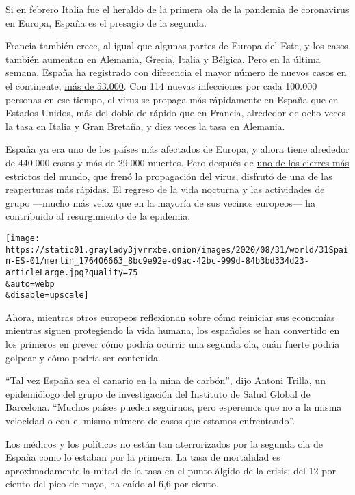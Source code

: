 Si en febrero Italia fue el heraldo de la primera ola de la pandemia de
coronavirus en Europa, España es el presagio de la segunda.

Francia también crece, al igual que algunas partes de Europa del Este, y
los casos también aumentan en Alemania, Grecia, Italia y Bélgica. Pero
en la última semana, España ha registrado con diferencia el mayor número
de nuevos casos en el continente,
\href{https://www.nytimes3xbfgragh.onion/interactive/2020/world/europe/spain-coronavirus-cases.html}{más
de 53.000}. Con 114 nuevas infecciones por cada 100.000 personas en ese
tiempo, el virus se propaga más rápidamente en España que en Estados
Unidos, más del doble de rápido que en Francia, alrededor de ocho veces
la tasa en Italia y Gran Bretaña, y diez veces la tasa en Alemania.

España ya era uno de los países más afectados de Europa, y ahora tiene
alrededor de 440.000 casos y más de 29.000 muertes. Pero después de
\href{https://www.nytimes3xbfgragh.onion/2020/04/07/world/europe/spain-coronavirus.html?searchResultPosition=119}{uno
de los cierres más estrictos del mundo}, que frenó la propagación del
virus, disfrutó de una de las reaperturas más rápidas. El regreso de la
vida nocturna y las actividades de grupo ---mucho más veloz que en la
mayoría de sus vecinos europeos--- ha contribuido al resurgimiento de la
epidemia.

\texttt{[image: https://static01.graylady3jvrrxbe.onion/images/2020/08/31/world/31Spain-ES-01/merlin\_176406663\_8bc9e92e-d9ac-42bc-999d-84b3bd334d23-articleLarge.jpg?quality=75\\\&auto=webp\\\&disable=upscale]}

Ahora, mientras otros europeos reflexionan sobre cómo reiniciar sus
economías mientras siguen protegiendo la vida humana, los españoles se
han convertido en los primeros en prever cómo podría ocurrir una segunda
ola, cuán fuerte podría golpear y cómo podría ser contenida.

``Tal vez España sea el canario en la mina de carbón'', dijo Antoni
Trilla, un epidemiólogo del grupo de investigación del Instituto de
Salud Global de Barcelona. ``Muchos países pueden seguirnos, pero
esperemos que no a la misma velocidad o con el mismo número de casos que
estamos enfrentando''.

Los médicos y los políticos no están tan aterrorizados por la segunda
ola de España como lo estaban por la primera. La tasa de mortalidad es
aproximadamente la mitad de la tasa en el punto álgido de la crisis: del
12 por ciento del pico de mayo, ha caído al 6,6 por ciento.

